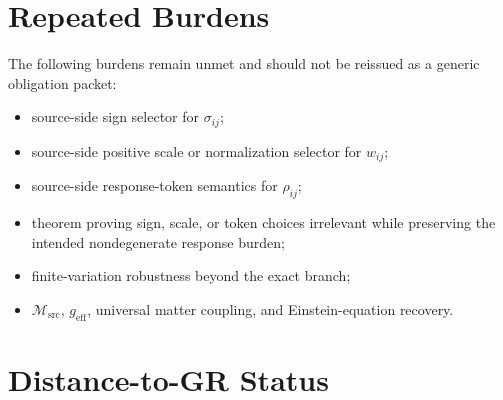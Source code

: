 \documentclass[11pt]{article}
\newcommand{\Msrc}{\mathcal{M}_{\mathrm{src}}}
\newcommand{\geff}{g_{\mathrm{eff}}}
\begin{document}
\section{Repeated Burdens}

The following burdens remain unmet and should not be reissued as a
generic obligation packet:
\begin{itemize}
    \item source-side sign selector for \(\sigma_{ij}\);
    \item source-side positive scale or normalization selector for
    \(w_{ij}\);
    \item source-side response-token semantics for \(\rho_{ij}\);
    \item theorem proving sign, scale, or token choices irrelevant
    while preserving the intended nondegenerate response burden;
    \item finite-variation robustness beyond the exact branch;
    \item \(\Msrc\), \(\geff\), universal matter coupling, and
    Einstein-equation recovery.
\end{itemize}

\section{Distance-to-GR Status}
\end{document}
